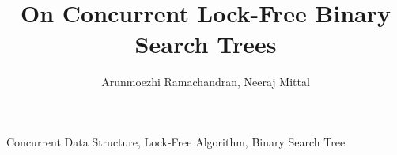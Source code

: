 \documentclass{llncs}
\begin{document}
\title{On Concurrent Lock-Free Binary Search Trees}

\author{Arunmoezhi Ramachandran, Neeraj Mittal}


\maketitle



\keywords
Concurrent Data Structure, Lock-Free Algorithm, Binary Search Tree















\end{document}
